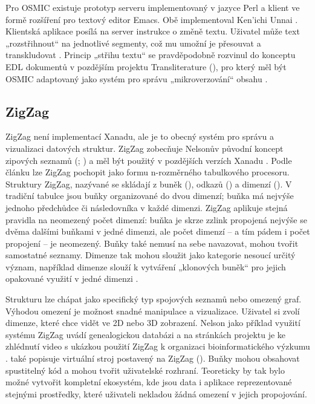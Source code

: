Pro OSMIC existuje prototyp serveru implementovaný v jazyce Perl a klient ve formě rozšíření pro textový editor Emacs. Obě implementoval Ken'ichi Unnai \autocite{OSMIC:install}. Klientská aplikace posílá na server instrukce o změně textu. Uživatel může text „rozstřihnout“ na jednotlivé segmenty, což mu umožní je přesouvat a transkludovat \autocite{OSMIC:use}. Princip „střihu textu“ se pravděpodobně rozvinul do konceptu EDL dokumentů v pozdějším projektu Transliterature (), pro který měl být OSMIC adaptovaný jako systém pro správu „mikroverzování“ obsahu \autocite[Microversion Management]{Translit}.

\subsection{ZigZag}
\label{sec:zigzag}

ZigZag není implementací Xanadu, ale je to obecný systém pro správu a vizualizaci datových struktur. ZigZag zobecňuje Nelsonův původní koncept zipových seznamů (\cite[2.1]{Nelson:ZigZag}; ) a měl být použitý v pozdějších verzích Xanadu \autocite[27]{Nelson1999b}. Podle článku  \autocite{Nelson:ZigZag} lze ZigZag pochopit jako formu n-rozměrného tabulkového procesoru. Struktury ZigZag, nazývané  se skládají z buněk (), odkazů () a dimenzí (). V tradiční tabulce jsou buňky organizované do dvou dimenzí; buňka má nejvýše jednoho předchůdce či následovníka v každé dimenzi. ZigZag aplikuje stejná pravidla na neomezený počet dimenzí: buňka je skrze zzlink propojená nejvýše se dvěma dalšími buňkami v jedné dimenzi, ale počet dimenzí -- a tím pádem i počet propojení -- je neomezený. Buňky také nemusí na sebe navazovat, mohou tvořit samostatné seznamy. Dimenze tak mohou sloužit jako kategorie nesoucí určitý význam, například dimenze  slouží k vytváření „klonových buněk“ pro jejich opakované využití v jedné dimenzi \autocite[4]{Nelson:ZigZag}.

Strukturu lze chápat jako specifický typ spojových seznamů nebo omezený graf. Výhodou omezení je možnost snadné manipulace a vizualizace. Uživatel si zvolí dimenze, které chce vidět ve 2D nebo 3D zobrazení. Nelson jako příklad využití systému ZigZag uvádí genealogickou databázi \autocite[8.2]{Nelson:ZigZag} a na stránkách projektu je ke zhlédnutí video s ukázkou použití ZigZag k organizaci bioinformatického výzkumu \autocite{Xanadu:ZigZag}. \Textcite[9]{Nelson:ZigZag} také popisuje virtuální stroj postavený na ZigZag (). Buňky mohou obsahovat spustitelný kód a mohou tvořit uživatelské rozhraní. Teoreticky by tak bylo možné vytvořit kompletní ekosystém, kde jsou data i aplikace reprezentované stejnými prostředky, které uživateli nekladou žádná omezení v jejich propojování.

